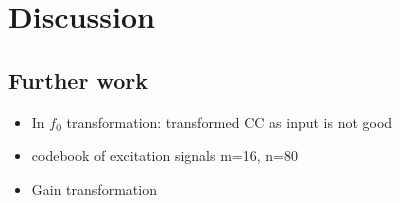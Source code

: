 \chapter{Discussion} %
\label{cha:discussion}

\section{Further work} %
\label{sec:further_work}
\begin{itemize}
	\item In $f_0$ transformation: transformed CC as input is not good
	\item codebook of excitation signals m=16, n=80
	\item Gain transformation
\end{itemize}
